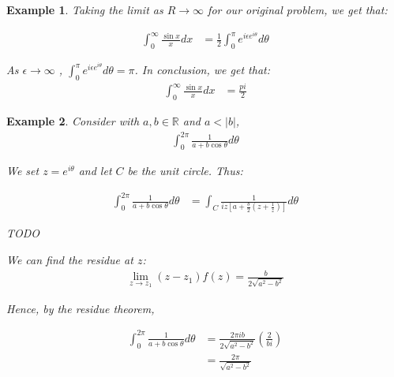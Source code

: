 \documentclass{article}
\newtheorem{ex}{Example}
\theoremstyle{definition}
\def\R{\mathbb{R}}
\begin{document}
\begin{ex}
Taking the limit as $R \to \infty$ for our original problem, we get that:

\begin{align}
\int_0^\infty \frac{\sin x}{x} dx  &= \frac{1}{2} \int_{0}^{\pi} e^{i \epsilon e^{i \theta }} d\theta 
\end{align}

As $\epsilon \to \infty$ , $\int_{0}^{\pi} e^{i \epsilon e^{i \theta }} d\theta = \pi$. In conclusion, we get that:
\begin{align}
\int_0^\infty \frac{\sin x}{x} dx  &= \frac{pi}{2}
\end{align}
\end{ex}

\begin{ex}
Consider with $a,b \in \R $ and $a<|b|$, 
\begin{align}
\int_0^{2\pi} \frac{1}{a+b \cos \theta} d\theta
\end{align}

We set $z=e^{i\theta}$ and let $C$ be the unit circle. Thus:

\begin{align}
\int_0^{2\pi} \frac{1}{a+b \cos \theta} d\theta &= \int_C \frac{1}{iz[a+\frac{b}{2} (z+\frac{1}{z})]} d\theta
\end{align}


TODO

We can find the residue at $z$: 
\begin{align}
\lim_{z \to z_1} (z-z_1) f(z) = \frac{b}{2\sqrt{a^2-b^2}}
\end{align}

Hence, by the residue theorem, 

\begin{align}
\int_0^{2\pi} \frac{1}{a+b \cos \theta} d\theta &= \frac{2\pi i b}{2\sqrt{a^2-b^2}} \left(\frac{2}{bi}\right) \\ 
&= \frac{2\pi }{\sqrt{a^2-b^2}} 
\end{align}


\end{ex}
\end{document}
